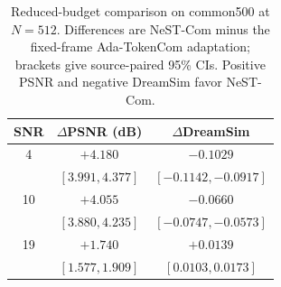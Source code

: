 \begin{table}[t]
\caption{Reduced-budget comparison on common500 at $N=512$. Differences are NeST-Com minus the fixed-frame Ada-TokenCom adaptation; brackets give source-paired 95\% CIs. Positive PSNR and negative DreamSim favor NeST-Com.}
\label{tab:reduced}
\centering\footnotesize
\setlength{\tabcolsep}{4pt}
\begin{tabular}{ccc}
\toprule SNR & $\Delta$PSNR (dB) & $\Delta$DreamSim \\
\midrule
4 & $+4.180$ & $-0.1029$ \\
 & $[3.991,4.377]$ & $[-0.1142,-0.0917]$ \\
10 & $+4.055$ & $-0.0660$ \\
 & $[3.880,4.235]$ & $[-0.0747,-0.0573]$ \\
19 & $+1.740$ & $+0.0139$ \\
 & $[1.577,1.909]$ & $[0.0103,0.0173]$ \\
\bottomrule
\end{tabular}
\end{table}
